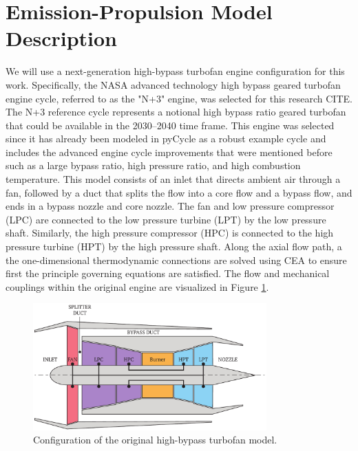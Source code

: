 \documentclass[]{icas2022}
\begin{document}
\section{Emission-Propulsion Model Description}
\label{sec:epModel}
We will use a next-generation high-bypass turbofan engine configuration for this work. Specifically, the NASA advanced technology high bypass geared turbofan engine cycle, referred to as the "N+3" engine, was selected for this research CITE. The N+3 reference cycle represents a notional high bypass ratio geared turbofan that could be available in the 2030–2040 time frame. This engine was selected since it has already been modeled in pyCycle as a robust example cycle and includes the advanced engine cycle improvements that were mentioned before such as a large bypass ratio, high pressure ratio, and high combustion temperature. This model consists of an inlet that directs ambient air through a fan, followed by a duct that splits the flow into a core flow and a bypass flow, and ends in a bypass nozzle and core nozzle. The fan and low pressure compressor (LPC) are connected to the low pressure turbine (LPT) by the low pressure shaft. Similarly, the high pressure compressor (HPC) is connected to the high pressure turbine (HPT) by the high pressure shaft. Along the axial flow path, a the one-dimensional thermodynamic connections are solved using CEA to ensure first the principle governing equations are satisfied. The flow and mechanical couplings within the original engine are visualized in Figure \ref{fig:hbtf_cycle}.

\begin{figure}[H]
	\centering
	\includegraphics[width=0.8\textwidth]{turbofan.pdf}
	\caption{Configuration of the original high-bypass turbofan model.}
	\label{fig:hbtf_cycle}
\end{figure}
\end{document}
